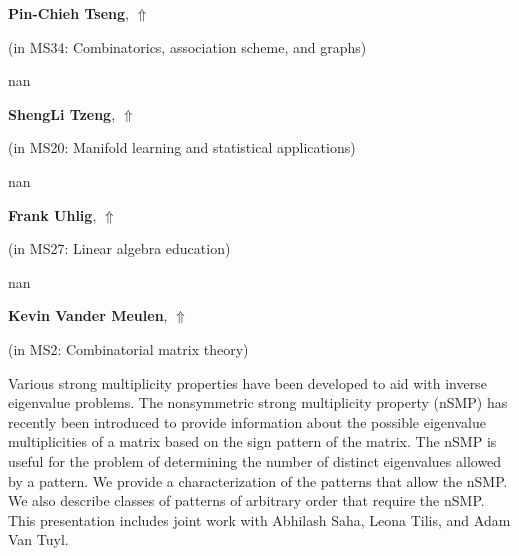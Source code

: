 \documentclass[ILAS2025-program.tex]{subfiles}
\begin{document}
     \hypertarget{down0288}{}\begin{ilasabstract}
    
    \textbf{Pin-Chieh Tseng},  \hfill \hyperlink{up0288}{$\Uparrow$}
    
    (in {\color{mstitle}MS34: Combinatorics, association scheme, and graphs})
        
        \mtskip
    nan\end{ilasabstract}
     \hypertarget{down0075}{}\begin{ilasabstract}
    
    \textbf{ShengLi Tzeng},  \hfill \hyperlink{up0075}{$\Uparrow$}
    
    (in {\color{mstitle}MS20: Manifold learning and statistical applications})
        
        \mtskip
    nan\end{ilasabstract}
     \hypertarget{down0260}{}\begin{ilasabstract}
    
    \textbf{Frank Uhlig},  \hfill \hyperlink{up0260}{$\Uparrow$}
    
    (in {\color{mstitle}MS27: Linear algebra education})
        
        \mtskip
    nan\end{ilasabstract}
     \hypertarget{down0142}{}\begin{ilasabstract}
    
    \textbf{Kevin Vander Meulen},  \hfill \hyperlink{up0142}{$\Uparrow$}
    
    (in {\color{mstitle}MS2: Combinatorial matrix theory})
        
        \mtskip
    Various strong multiplicity properties have been developed to aid
with inverse eigenvalue problems. The nonsymmetric strong multiplicity
property (nSMP) has recently been introduced to provide information
about the possible eigenvalue multiplicities of a matrix based on the
sign pattern of the matrix. The nSMP is useful for the problem
of determining the number of distinct eigenvalues allowed by a pattern.
We provide a characterization of the patterns that allow
the nSMP. We also describe classes of patterns of arbitrary order
that require the nSMP. This presentation includes joint work
with Abhilash Saha, Leona Tilis, and Adam Van Tuyl.
\end{ilasabstract}
\end{document}
